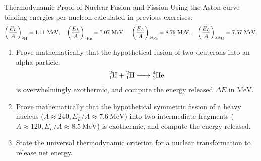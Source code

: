 \begin{exercise}{Thermodynamic Proof of Nuclear Fusion and Fission}
Using the Aston curve binding energies per nucleon calculated in previous exercises:
\[
\left(\frac{E_L}{A}\right)_{\ce{^{2}H}} = 1.11\ \mathrm{MeV}, \quad 
\left(\frac{E_L}{A}\right)_{\ce{^{4}He}} = 7.07\ \mathrm{MeV}, \quad 
\left(\frac{E_L}{A}\right)_{\ce{^{56}Fe}} = 8.79\ \mathrm{MeV}, \quad 
\left(\frac{E_L}{A}\right)_{\ce{^{238}U}} = 7.57\ \mathrm{MeV}.
\]
\begin{enumerate}[leftmargin=1.5em,itemsep=2pt]
  \item Prove mathematically that the hypothetical fusion of two deuterons into an alpha particle:
  \[
  \ce{^{2}_{1}H + ^{2}_{1}H -> ^{4}_{2}He}
  \]
  is overwhelmingly exothermic, and compute the energy released $\Delta E$ in $\mathrm{MeV}$.
  \item Prove mathematically that the hypothetical symmetric fission of a heavy nucleus ($A \approx 240, E_L/A \approx 7.6\ \mathrm{MeV}$) into two intermediate fragments ($A \approx 120, E_L/A \approx 8.5\ \mathrm{MeV}$) is exothermic, and compute the energy released.
  \item State the universal thermodynamic criterion for a nuclear transformation to release net energy.
\end{enumerate}
\end{exercise}

\begin{tabletworkspace}[5.0cm]
\end{tabletworkspace}

